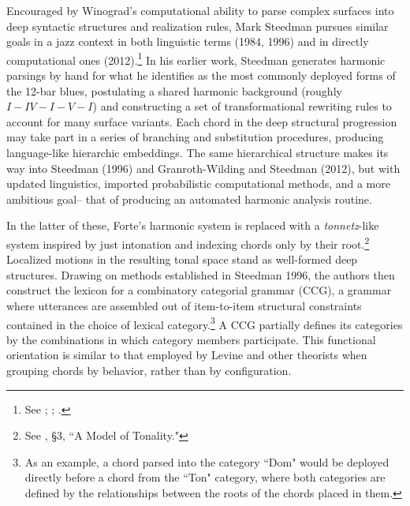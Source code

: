 Encouraged by Winograd's computational ability to parse complex surfaces into deep syntactic structures and realization rules, Mark Steedman pursues similar goals in a jazz context in both linguistic terms (1984, 1996) and in directly computational ones (2012).\footnote{See \cite{steedman1984}; \cite{steedman1996}; \cite{granroth2012}.}  In his earlier work, Steedman generates harmonic parsings by hand for what he identifies as the most commonly deployed forms of the 12-bar blues, postulating a shared harmonic background (roughly $I-IV-I-V-I$) and constructing a set of transformational rewriting rules to account for many surface variants.  Each chord in the deep structural progression may take part in a series of branching and substitution procedures, producing language-like hierarchic embeddings. The same hierarchical structure makes its way into Steedman (1996) and Granroth-Wilding and Steedman (2012), but with updated linguistics, imported probabilistic computational methods, and a more ambitious goal-- that of producing an automated harmonic analysis routine.

In the latter of these, Forte's harmonic system is replaced with a \emph{tonnetz}-like system inspired by just intonation and indexing chords only by their root.\footnote{See \cite{granroth2012}, \S 3, ``A Model of Tonality."}  Localized motions in the resulting tonal space stand as well-formed deep structures.  Drawing on methods established in Steedman 1996, the authors then construct the lexicon for a combinatory categorial grammar (CCG), a grammar where utterances are assembled out of item-to-item structural constraints contained in the choice of lexical category.\footnote{As an example, a chord parsed into the category ``Dom" would be deployed directly before a chord from the ``Ton" category, where both categories are defined by the relationships between the roots of the chords placed in them.}  A CCG partially defines its categories by the combinations in which category members participate.  This functional orientation is similar to that employed by Levine and other theorists when grouping chords by behavior, rather than by configuration.

